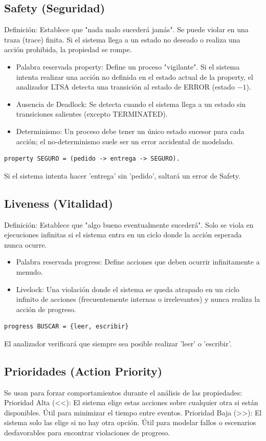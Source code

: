 \documentclass[11pt,a4paper]{article}
\begin{document}
\subsection{Safety (Seguridad)}
Definición: Establece que "nada malo sucederá jamás". Se puede violar en una traza (trace) finita. Si el sistema llega a un estado no deseado o realiza una acción prohibida, la propiedad se rompe.
\begin{itemize}
    \item Palabra reservada property: Define un proceso "vigilante". Si el sistema intenta realizar una acción no definida en el estado actual de la property, el analizador LTSA detecta una transición al estado de ERROR (estado $-1$).
    \item Ausencia de Deadlock: Se detecta cuando el sistema llega a un estado sin transiciones salientes (excepto TERMINATED).
    \item Determinismo: Un proceso debe tener un único estado sucesor para cada acción; el no-determinismo suele ser un error accidental de modelado.
\end{itemize}
\begin{lstlisting}[caption=Ejemplo de propiedad de seguridad]
property SEGURO = (pedido -> entrega -> SEGURO).
\end{lstlisting}
Si el sistema intenta hacer 'entrega' sin 'pedido', saltará un error de Safety.

\subsection{Liveness (Vitalidad)}
Definición: Establece que "algo bueno eventualmente sucederá". Solo se viola en ejecuciones infinitas si el sistema entra en un ciclo donde la acción esperada nunca ocurre.
\begin{itemize}
    \item Palabra reservada progress: Define acciones que deben ocurrir infinitamente a menudo.
    \item Livelock: Una violación donde el sistema se queda atrapado en un ciclo infinito de acciones (frecuentemente internas o irrelevantes) y nunca realiza la acción de progreso.
\end{itemize}
\begin{lstlisting}[caption=Definición de progreso]
progress BUSCAR = {leer, escribir}
\end{lstlisting}
El analizador verificará que siempre sea posible realizar 'leer' o 'escribir'.

\subsection{Prioridades (Action Priority)}
Se usan para forzar comportamientos durante el análisis de las propiedades:
Prioridad Alta (<<): El sistema elige estas acciones sobre cualquier otra si están disponibles. Útil para minimizar el tiempo entre eventos.
Prioridad Baja (>>): El sistema solo las elige si no hay otra opción. Útil para modelar fallos o escenarios desfavorables para encontrar violaciones de progreso.
\end{document}

